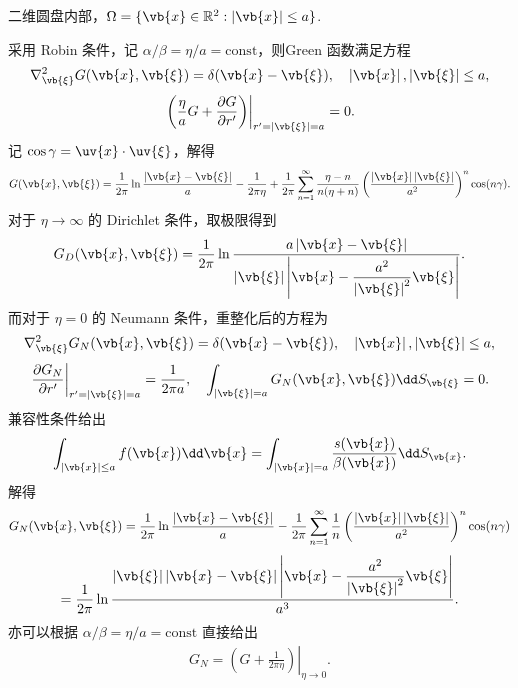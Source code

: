 \begin{exbox}
	二维圆盘内部，\(\Omega=\{\vb{x}\in\mathbb{R}^2:\left|\vb{x}\right|\leq a\}\).
	
	采用 Robin 条件，记 \(\alpha/\beta=\eta/a=\mathrm{const}\)，则Green 函数满足方程
	\begin{align*}
		\nabla_{\vb{\xi}}^2G(\vb{x},\vb{\xi})=\delta(\vb{x}-\vb{\xi}),\quad
		\left|\vb{x}\right|,\left|\vb{\xi}\right|\leq a,
	\end{align*}
	\begin{align*}
		\left.\left(\frac{\eta}{a}G+\frac{\partial G}{\partial r'}\right)\right|_{r'=\left|\vb{\xi}\right|=a}=0.
	\end{align*}
	记 \(\cos\gamma=\uv{x}\cdot\uv{\xi}\)，解得
	\begin{align*}
		G(\vb{x},\vb{\xi})
		=\frac{1}{2\pi}\ln\frac{\left|\vb{x}-\vb{\xi}\right|}{a}-\frac{1}{2\pi\eta}
		+\frac{1}{2\pi}\sum_{n=1}^\infty\frac{\eta-n}{n(\eta+n)}\left(\frac{\left|\vb{x}\right|\left|\vb{\xi}\right|}{a^2}\right)^n\cos(n\gamma).
	\end{align*}
	对于 \(\eta\to\infty\) 的 Dirichlet 条件，取极限得到
	\begin{align*}
		G_D(\vb{x},\vb{\xi})
		=\frac{1}{2\pi}\ln\frac{a\left|\vb{x}-\vb{\xi}\right|}{\left|\vb{\xi}\right|\left|\vb{x}-\dfrac{a^2}{\left|\vb{\xi}\right|^2}\vb{\xi}\right|}.
	\end{align*}
	而对于 \(\eta=0\) 的 Neumann 条件，重整化后的方程为
	\begin{align*}
		\nabla_{\vb{\xi}}^2G_N(\vb{x},\vb{\xi})=\delta(\vb{x}-\vb{\xi}),\quad
		\left|\vb{x}\right|,\left|\vb{\xi}\right|\leq a,
	\end{align*}
	\begin{align*}
		\left.\frac{\partial G_N}{\partial r'}\right|_{r'=\left|\vb{\xi}\right|=a}=\frac{1}{2\pi a},\quad
		\int_{\left|\vb{\xi}\right|=a}G_N(\vb{x},\vb{\xi})\dd S_{\vb{\xi}}=0.
	\end{align*}
	兼容性条件给出
	\begin{align*}
		\int_{\left|\vb{x}\right|\leq a}f(\vb{x})\dd\vb{x}
		=\int_{\left|\vb{x}\right|=a}\frac{s(\vb{x})}{\beta(\vb{x})}\dd S_{\vb{x}}.
	\end{align*}
	解得
	\begin{align*}
		G_N(\vb{x},\vb{\xi})
		=\frac{1}{2\pi}\ln\frac{\left|\vb{x}-\vb{\xi}\right|}{a}
		-\frac{1}{2\pi}\sum_{n=1}^\infty\frac{1}{n}\left(\frac{\left|\vb{x}\right|\left|\vb{\xi}\right|}{a^2}\right)^n\cos(n\gamma)
	\end{align*}
	\begin{align*}
		=\frac{1}{2\pi}\ln\frac{\left|\vb{\xi}\right|\left|\vb{x}-\vb{\xi}\right|\left|\vb{x}-\dfrac{a^2}{\left|\vb{\xi}\right|^2}\vb{\xi}\right|}{a^3}.
	\end{align*}
	亦可以根据 \(\alpha/\beta=\eta/a=\mathrm{const}\) 直接给出
	\begin{align*}
		G_N=\left.\left(G+\frac{1}{2\pi\eta}\right)\right|_{\eta\to0}.
	\end{align*}
\end{exbox}

